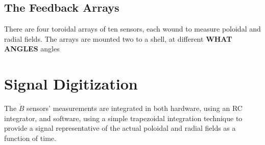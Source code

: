 \subsection{The Feedback Arrays}
There are four toroidal arrays of ten sensors, each wound to measure poloidal and radial fields.  The arrays are mounted two to a shell, at different \textbf{WHAT ANGLES} angles
\section{Signal Digitization}
The $\dot{B}$ sensors' measurements are integrated in both hardware, using an RC integrator, and software, using a simple trapezoidal integration technique to provide a signal representative of the actual poloidal and radial fields as a function of time.  